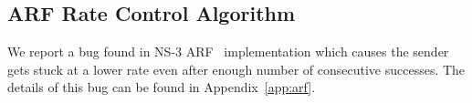 \subsection{ARF Rate Control Algorithm}
\label{subsec:arf}

We report a bug found in NS-3 ARF~\cite{kamerman1997wavelan} implementation
which causes the sender gets stuck at a lower rate even after enough number of
consecutive successes. The details of this bug can be found in
Appendix~\ref{app:arf}. 
